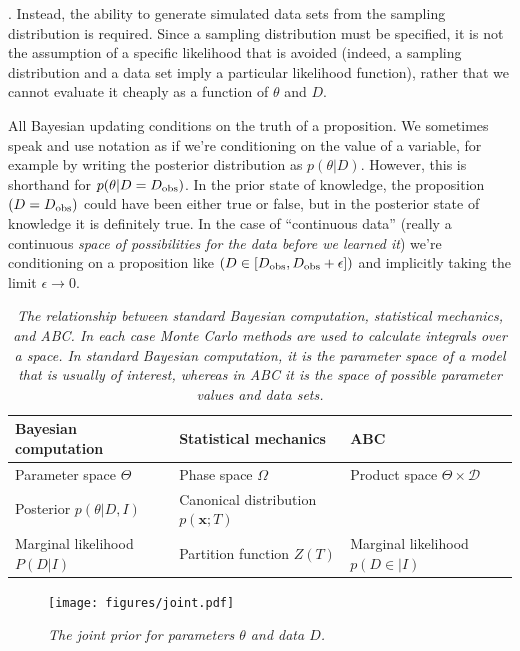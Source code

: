 \documentclass[article]{jss}
\newcommand{\params}{\theta}
\newcommand{\data}{D}
\newcommand{\dobs}{D_{\rm obs}}
\begin{document}
. Instead, the ability to
generate simulated data sets from the sampling distribution is required.
Since a sampling distribution must be specified, it is not the assumption of
a specific likelihood that is avoided (indeed, a sampling distribution and
a data set imply a particular likelihood function), rather that we cannot
evaluate it cheaply as a function of $\params$ and $\data$.

All Bayesian updating conditions on the truth of a proposition. We sometimes
speak and use notation as if we're conditioning on the value of a variable, for
example by writing the posterior distribution as $p(\params | \data)$. However,
this is shorthand for $p(\params | \data = \dobs)$. In the prior state of
knowledge, the proposition $(\data = \dobs)$ could have been either true or
false, but in the posterior state of knowledge it is definitely true.
In the case of ``continuous data'' (really a continuous {\it space of
possibilities for the data before we learned it}) we're conditioning on a
proposition like $(\data \in [\dobs, \dobs+\epsilon])$ and implicitly
taking the limit $\epsilon \to 0$.

\begin{table}[ht!]
\centering
\small
\begin{tabular}{|l|l|l|}
\hline
Bayesian computation		&		Statistical mechanics		&		ABC\\
\hline
Parameter space	$\Theta$	&		Phase space	$\Omega$ 			& Product space $\Theta \times \mathcal{D}$\\
Posterior $p(\params | D,I)$   &  Canonical distribution $p(\boldsymbol{x}; T)$     & \\ 
Marginal likelihood $P(D|I)$	&	Partition function $Z(T)$	&   Marginal likelihood $p(D\in | I)$\\
\hline
\end{tabular}
\caption{\it The relationship between standard Bayesian computation, statistical
mechanics, and ABC. In each case Monte Carlo methods are used to calculate
integrals over a space. In standard Bayesian computation, it is the parameter
space of a model that is usually of interest, whereas in ABC it is the space
of possible parameter values {\it and} data sets.
\label{tab:relation}}
\end{table}


\begin{figure}[ht!]
\centering
\texttt{[image: figures/joint.pdf]}
\caption{\it The joint prior for parameters $\params$ and data $\data$.
\label{fig:joint}}
\end{figure}
\end{document}
